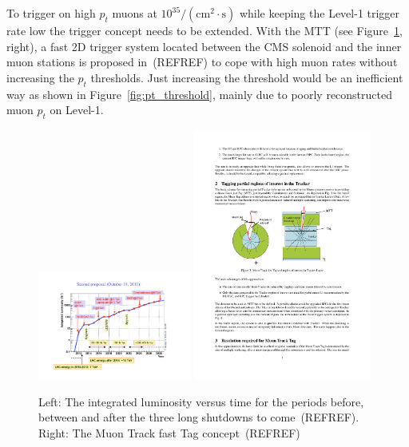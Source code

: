 To trigger on high $p_t$ muons at $10^{35}/(\mathrm{cm}^2 \cdot\mathrm{s})$ while keeping the Level-1 trigger rate low the trigger concept needs to be extended. With the MTT (see 
Figure~\ref{fig:schedule_concept}, right), a fast 2D trigger system located between the CMS solenoid and the inner muon stations is proposed in~(REFREF) to cope with high 
muon rates without increasing the $p_t$ thresholds. Just increasing the threshold would be an inefficient way as shown in Figure~\ref{fig:pt_threshold}, mainly due to poorly 
reconstructed muon $p_t$ on Level-1. 
\begin{figure}[htbp]
\centering
\includegraphics[width=0.45\textwidth]{Figures/pooth/schedule.pdf}
\includegraphics[width=0.52\textwidth]{Figures/pooth/mtt_concept_a.pdf}
\caption{Left: The integrated luminosity versus time for the periods before, between and after the three long shutdowns to come~(REFREF). Right: The Muon Track fast Tag concept~(REFREF) } 
\label{fig:schedule_concept}
\end{figure}

